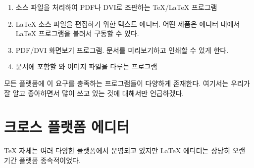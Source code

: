 \begin{enumerate}

\item 소스 파일을 처리하여 PDF나 DVI로 조판하는 \TeX{}/\LaTeX{} 프로그램
\item \LaTeX{} 소스 파일을 편집하기 위한 텍스트 에디터. 어떤 제품은 에디터 내에서 \LaTeX{} 프로그램을 불러서 구동할 수 있다.
\item PDF/DVI 화면보기 프로그램. 문서를 미리보기하고 인쇄할 수 있게 한다.
\item 문서에 포함할 \PSi{}와 이미지 파일을 다루는 프로그램
\end{enumerate}

모든 플랫폼에 이 요구를 충족하는 프로그램들이 다양하게 존재한다. 여기서는 우리가 잘 알고 좋아하면서 많이 쓰고 있는 것에 대해서만 언급하겠다.

\section{크로스 플랫폼 에디터}
\label{sec:texmaker}

\TeX{} 자체는 여러 다양한 플랫폼에서 운영되고 있지만 \LaTeX{} 에디터는 상당히 오랜 기간 플랫폼 종속적이었다.

